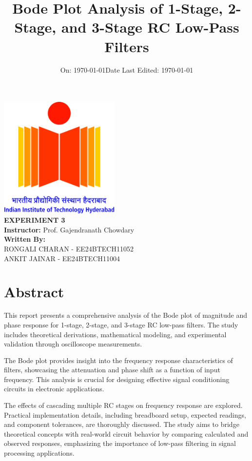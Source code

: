 \documentclass[12pt,a4paper]{report}
\title{\LARGE \textbf{Bode Plot Analysis of 1-Stage, 2-Stage, and 3-Stage RC Low-Pass Filters}}
\author{}
\date{\large On: \today}
\begin{document}
\begin{titlepage}
    \centering
    \vspace*{1cm}
    { \includegraphics[width=6cm]{figs/logo.jpg}}\\[1cm]
    {\LARGE \textbf{EXPERIMENT 3}}\\[1cm]
    \textbf{Instructor: }{Prof. Gajendranath Chowdary}\\[1cm]
    \textbf{Written By:}\\{RONGALI CHARAN - EE24BTECH11052\\ ANKIT JAINAR - EE24BTECH11004}\\[1cm] \date{\large Date Last Edited: \today}
\end{titlepage}

\chapter*{Abstract}
This report presents a comprehensive analysis of the Bode plot of magnitude and phase response for 1-stage, 2-stage, and 3-stage RC low-pass filters. The study includes theoretical derivations, mathematical modeling, and experimental validation through oscilloscope measurements. 

The Bode plot provides insight into the frequency response characteristics of filters, showcasing the attenuation and phase shift as a function of input frequency. This analysis is crucial for designing effective signal conditioning circuits in electronic applications.

The effects of cascading multiple RC stages on frequency response are explored. Practical implementation details, including breadboard setup, expected readings, and component tolerances, are thoroughly discussed. The study aims to bridge theoretical concepts with real-world circuit behavior by comparing calculated and observed responses, emphasizing the importance of low-pass filtering in signal processing applications.
\end{document}
